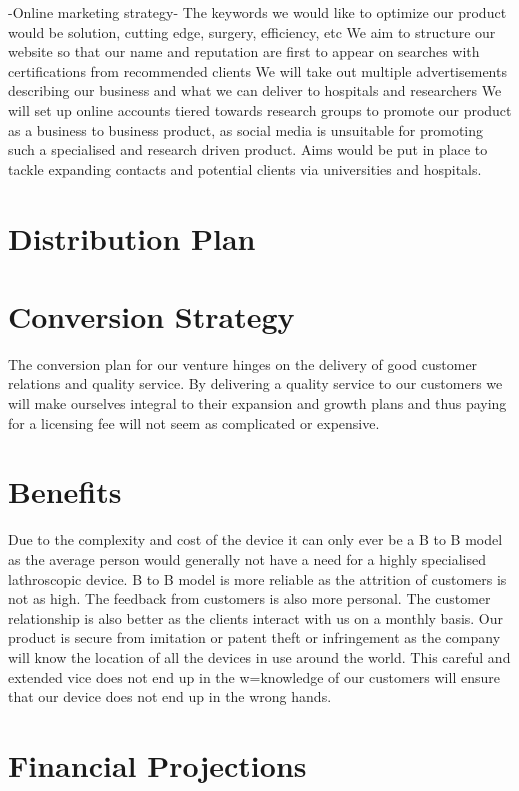\documentclass{article}
\begin{document}
-Online marketing strategy-
The keywords we would like to optimize our product would be solution, cutting edge, surgery, efficiency, etc
We aim to structure our website so that our name and reputation are first to appear on searches with certifications from recommended clients
We will take out multiple advertisements describing our business and what we can deliver to hospitals and researchers
We will set up online accounts tiered towards research groups to promote our product as a business to business product, as social media is unsuitable for promoting such a specialised and research driven product. Aims would be put in place to tackle expanding contacts and potential clients via universities and hospitals.





\section{Distribution Plan}



\section{Conversion Strategy}
The conversion plan for our venture hinges on the delivery of good customer relations and quality service. By delivering a quality service to our customers we will make ourselves integral to their expansion and growth plans and thus paying for a licensing fee will not seem as complicated or expensive.

\section{Benefits}
Due to the complexity and cost of the device it can only ever be a B to B model as the average person would generally not have a need for a highly specialised lathroscopic device.
B to B model is more reliable as the attrition of customers is not as high. The feedback from customers is also more personal. The customer relationship is also better as the clients interact with us on a monthly basis.
Our product is secure from imitation or patent theft or infringement as the company will know the location of all the devices in use around the world. This careful and extended vice does not end up in the w=knowledge of our customers will ensure that our device does not end up in the wrong hands.

\section{Financial Projections}
\end{document}
